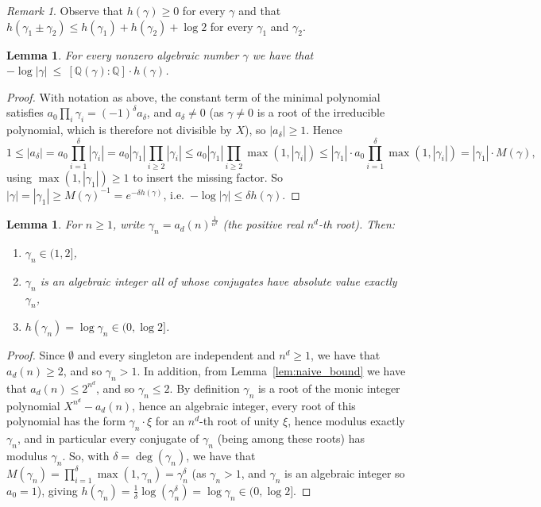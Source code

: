 \documentclass{article}
\theoremstyle{plain}
\newtheorem{lemma}[theorem]{Lemma}
\theoremstyle{definition}
\theoremstyle{remark}
\newtheorem{remark}[theorem]{Remark}
\newcommand{\Z}{\mathbb{Z}}
\newcommand{\Q}{\mathbb{Q}}
\begin{document}
\begin{remark}
    Observe that $h(\gamma) \geq 0$ for every $\gamma$ and that $h(\gamma_1\pm\gamma_2)\le h(\gamma_1)+h(\gamma_2)+\log2$ for every $\gamma_1$ and $\gamma_2$. 
\end{remark}

\begin{lemma}\label{lem:liouville}
For every nonzero algebraic number $\gamma$ we have that $-\log|\gamma|\ \le\ [\Q(\gamma):\Q]\cdot h(\gamma)$.
\end{lemma}
\begin{proof}
With notation as above, the constant term of the minimal polynomial satisfies $a_0\prod_i\gamma_i=(-1)^\delta a_\delta$, and $a_\delta\ne0$ (as $\gamma\ne0$ is a root of the irreducible polynomial, which is therefore not divisible by $X$), so $|a_\delta|\ge1$. Hence
\[
1 \le |a_\delta| = a_0\prod_{i=1}^\delta|\gamma_i| = a_0|\gamma_1|\prod_{i\ge2}|\gamma_i| \le a_0|\gamma_1|\prod_{i\ge2}\max(1,|\gamma_i|) \le |\gamma_1|\cdot a_0\prod_{i=1}^\delta\max(1,|\gamma_i|) = |\gamma_1|\cdot M(\gamma),
\]
using $\max(1,|\gamma_1|)\ge1$ to insert the missing factor. So $|\gamma|=|\gamma_1|\ge M(\gamma)^{-1}=e^{-\delta h(\gamma)}$, i.e.\ $-\log|\gamma|\le\delta h(\gamma)$.
\end{proof}

\begin{lemma}\label{lem:betaheight}
For $n\ge1$, write $\gamma_n=a_d(n)^{\frac{1}{n^d}}$ (the positive real $n^d$-th root). Then:
\begin{enumerate}
    \item $\gamma_n\in(1,2]$,
    \item $\gamma_n$ is an algebraic integer all of whose conjugates have absolute value exactly $\gamma_n$, 
    \item $h(\gamma_n)=\log\gamma_n\in(0,\log2]$.
\end{enumerate}
\end{lemma}
\begin{proof}
Since $\emptyset$ and every singleton are independent and $n^d\ge1$, we have that $a_d(n)\ge2$, and so $\gamma_n>1$. In addition, from Lemma~\ref{lem:naive_bound} we have that $a_d(n)\le2^{n^d}$, and so $\gamma_n\le2$. By definition $\gamma_n$ is a root of the monic integer polynomial $X^{n^d}-a_d(n)$, hence an algebraic integer, every root of this polynomial has the form $\gamma_n\cdot\xi$ for an $n^d$-th root of unity $\xi$, hence modulus exactly $\gamma_n$, and in particular every conjugate of $\gamma_n$ (being among these roots) has modulus $\gamma_n$. So, with $\delta=\deg(\gamma_n)$, we have that $M(\gamma_n)=\prod_{i=1}^\delta\max(1,\gamma_n)=\gamma_n^\delta$ (as $\gamma_n>1$, and $\gamma_n$ is an algebraic integer so $a_0=1$), giving $h(\gamma_n)=\tfrac1\delta\log(\gamma_n^\delta)=\log\gamma_n\in(0,\log2]$.
\end{proof}
\end{document}

